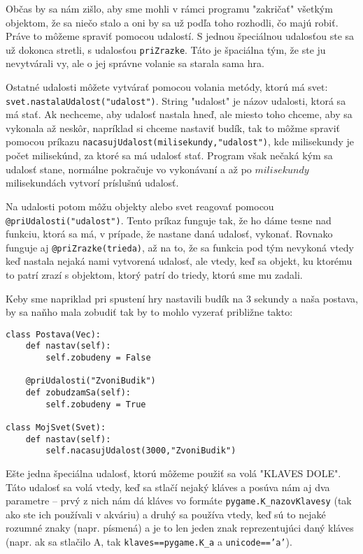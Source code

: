 Občas by sa nám zišlo, aby sme mohli v rámci programu "zakričať" všetkým objektom, že sa niečo stalo
a oni by sa už podľa toho rozhodli, čo majú robiť. Práve to môžeme spraviť pomocou udalostí. S
jednou špeciálnou udalosťou ste sa už dokonca stretli, s udalosťou \texttt{priZrazke}. Táto je špaciálna tým,
že ste ju nevytvárali vy, ale o jej správne volanie sa starala sama hra.

Ostatné udalosti môžete vytvárať pomocou volania metódy, ktorú má svet:
\texttt{svet.nastalaUdalost("udalost")}. String "udalost" je názov udalosti, ktorá sa má stať. Ak nechceme,
aby udalosť nastala hneď, ale miesto toho chceme, aby sa vykonala až neskôr, napríklad si chceme
nastaviť budík, tak to môžme spraviť pomocou príkazu
\texttt{nacasujUdalost(milisekundy,"udalost")}, kde milisekundy je počet milisekúnd, za ktoré sa má
udalosť stať. Program však nečaká kým sa udalosť stane, normálne pokračuje vo vykonávaní a až po
$milisekundy$ milisekundách vytvorí príslušnú udalosť.

Na udalosti potom môžu objekty alebo svet reagovať pomocou \texttt{@priUdalosti("udalost")}. Tento
príkaz funguje tak, že ho dáme tesne nad funkciu, ktorá sa má, v prípade, že nastane daná udalosť,
vykonať. Rovnako funguje aj \texttt{@priZrazke(trieda)}, až na to, že sa funkcia pod tým nevykoná
vtedy keď nastala nejaká nami vytvorená udalosť, ale vtedy, keď sa objekt, ku ktorému to patrí zrazí
s objektom, ktorý patrí do triedy, ktorú sme mu zadali.

Keby sme napriklad pri spustení hry nastavili budík na $3$ sekundy a naša postava, by sa naňho mala
zobudiť tak by to mohlo vyzerať približne takto:

\begin{lstlisting}
class Postava(Vec):
    def nastav(self):
        self.zobudeny = False
    
    @priUdalosti("ZvoniBudik")
    def zobudzamSa(self):
        self.zobudeny = True

class MojSvet(Svet):
	def nastav(self):
		self.nacasujUdalost(3000,"ZvoniBudik")
\end{lstlisting}

Ešte jedna špeciálna udalosť, ktorú môžeme použiť sa volá "KLAVES DOLE". Táto udalosť sa volá vtedy, keď sa
stlačí nejaký kláves a posúva nám aj dva parametre -- prvý z nich nám dá kláves vo formáte
\texttt{pygame.K\_nazovKlavesy} (tak ako ste ich používali v akváriu) a druhý sa používa vtedy, keď sú to
nejaké rozumné znaky (napr. písmená) a je to len jeden znak reprezentujúci daný kláves (napr. ak sa
stlačilo A, tak \texttt{klaves==pygame.K\_a} a \texttt{unicode=='a'}).

